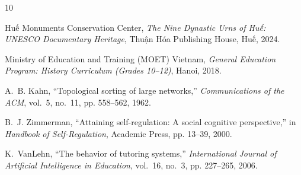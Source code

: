 \documentclass[11pt,a4paper]{article}
\begin{document}

\begin{thebibliography}{10}

Huế Monuments Conservation Center, \emph{The Nine Dynastic Urns of Huế: UNESCO Documentary Heritage}, Thuận Hóa Publishing House, Huế, 2024.

Ministry of Education and Training (MOET) Vietnam, \emph{General Education Program: History Curriculum (Grades 10--12)}, Hanoi, 2018.

A.~B. Kahn, ``Topological sorting of large networks,'' \emph{Communications of the ACM}, vol.~5, no.~11, pp. 558--562, 1962.

B.~J. Zimmerman, ``Attaining self-regulation: A social cognitive perspective,'' in \emph{Handbook of Self-Regulation}, Academic Press, pp. 13--39, 2000.

K.~VanLehn, ``The behavior of tutoring systems,'' \emph{International Journal of Artificial Intelligence in Education}, vol.~16, no.~3, pp. 227--265, 2006.

\end{thebibliography}
\end{document}
